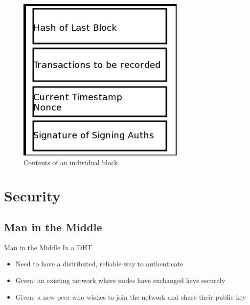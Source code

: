 \documentclass[11pt]{beamer}
\begin{document}
\begin{frame}
	\begin{figure}
	\centering
	\includegraphics[width=0.4\linewidth]{namecoin_block}
	\caption{Contents of an individual block.}
	\label{fig:blockchain}
	\end{figure}

\end{frame}


\section{Security}
\subsection{Man in the Middle}

\begin{frame}{Man in the Middle In a DHT}

	\begin{itemize}
		\item Need to have a distributed, reliable way to authenticate 
		\item  Given: an existing network where nodes have exchanged keys securely
		\item  Given: a new peer who wishes to join the network and share their public key
	
	\end{itemize}


\end{frame}
\end{document}
